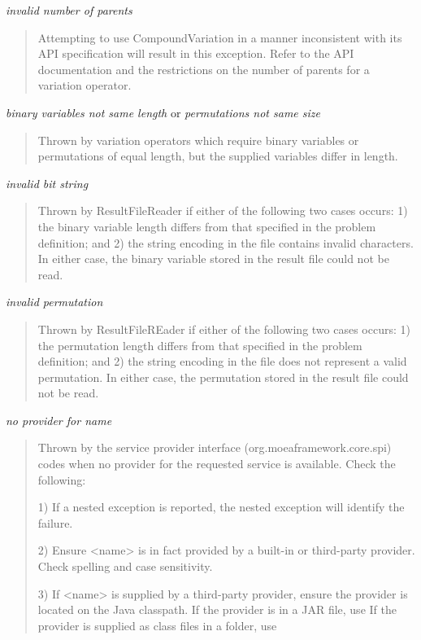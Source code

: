 \noindent
\textit{invalid number of parents}
\begin{quote}
  Attempting to use CompoundVariation in a manner inconsistent with its API specification will result in this exception.  Refer to the API documentation and the restrictions on the number of parents for a variation operator.
\end{quote}

\noindent
\textit{binary variables not same length} or
\textit{permutations not same size}
\begin{quote}
  Thrown by variation operators which require binary variables or permutations of equal length, but the supplied variables differ in length.
\end{quote}

\noindent  
\textit{invalid bit string}
\begin{quote}
  Thrown by ResultFileReader if either of the following two cases occurs: 1) the binary variable length differs from that specified in the problem definition; and 2) the string encoding in the file contains invalid characters.  In either case, the binary variable stored in the result file could not be read.
\end{quote}

\noindent  
\textit{invalid permutation}
\begin{quote}
  Thrown by ResultFileREader if either of the following two cases occurs: 1) the permutation length differs from that specified in the problem definition; and 2) the string encoding in the file does not represent a valid permutation.  In either case, the permutation stored in the result file could not be read.
\end{quote}

\noindent
\textit{no provider for \<name\>}
\begin{quote}
  Thrown by the service provider interface (org.moeaframework.core.spi) codes when no provider for the requested service is available.  Check the following:
  
    1) If a nested exception is reported, the nested exception will identify the failure.
       
    2) Ensure <name> is in fact provided by a built-in or third-party provider. Check spelling and case sensitivity.
       
    3) If <name> is supplied by a third-party provider, ensure the provider is located on the Java classpath.  If the provider is in a JAR file, use
       If the provider is supplied as class files in a folder, use
\end{quote}

